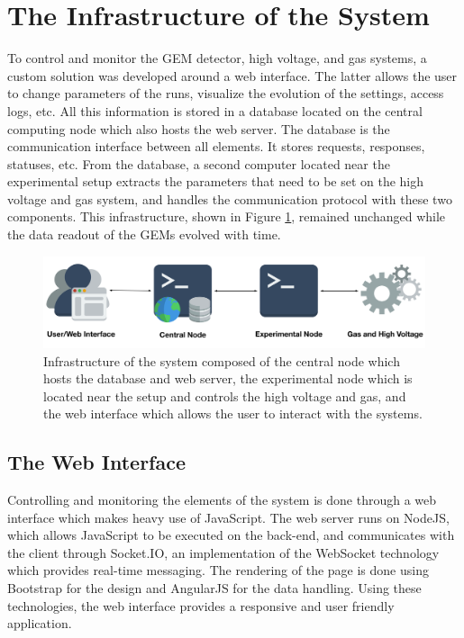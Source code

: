   \section{The Infrastructure of the System}

    To control and monitor the GEM detector, high voltage, and gas systems, a custom solution was developed around a web interface. The latter allows the user to change parameters of the runs, visualize the evolution of the settings, access logs, etc. All this information is stored in a database located on the central computing node which also hosts the web server. The database is the communication interface between all elements. It stores requests, responses, statuses, etc. From the database, a second computer located near the experimental setup extracts the parameters that need to be set on the high voltage and gas system, and handles the communication protocol with these two components. This infrastructure, shown in Figure \ref{fig:III-1-sys-infra}, remained unchanged while the data readout of the GEMs evolved with time.

    \begin{figure}[h!]
      \centering
      \includegraphics[width=\textwidth]{img/III-1-arch/sys.png}
      \caption{Infrastructure of the system composed of the central node which hosts the database and web server, the experimental node which is located near the setup and controls the high voltage and gas, and the web interface which allows the user to interact with the systems.}
      \label{fig:III-1-sys-infra}
    \end{figure}

    \subsection{The Web Interface}

      Controlling and monitoring the elements of the system is done through a web interface which makes heavy use of JavaScript. The web server runs on NodeJS, which allows JavaScript to be executed on the back-end, and communicates with the client through Socket.IO, an implementation of the WebSocket technology which provides real-time messaging. The rendering of the page is done using Bootstrap for the design and AngularJS for the data handling. Using these technologies, the web interface provides a responsive and user friendly application. \\

